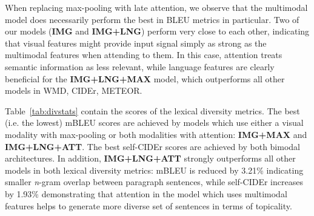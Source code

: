 \documentclass[11pt,a4paper]{article}
\begin{document}


When replacing max-pooling with late attention, we observe that the multimodal model does necessarily perform the best in BLEU metrics in particular.
Two of our models (\textbf{IMG} and \textbf{IMG+LNG}) perform very close to each other, indicating that visual features might provide input signal simply as strong as the multimodal features when attending to them.
In this case, attention treats semantic information as less relevant, while language features are clearly beneficial for the \textbf{IMG+LNG+MAX} model, which outperforms all other models in WMD, CIDEr, METEOR.


Table~\ref{tab:divstats} contain the scores of the lexical diversity metrics. %
The best (i.e. the lowest) mBLEU scores are achieved by models which use either a visual modality with max-pooling or both modalities with attention: \textbf{IMG+MAX} and \textbf{IMG+LNG+ATT}.
The best self-CIDEr scores are achieved by both bimodal architectures.
In addition, \textbf{IMG+LNG+ATT} strongly outperforms all other models in both lexical diversity metrics: mBLEU is reduced by 3.21\% indicating smaller \textit{n}-gram overlap between paragraph sentences, while self-CIDEr increases by 1.93\% demonstrating that attention in the model which uses multimodal features helps to generate more diverse set of sentences in terms of topicality.
\end{document}
